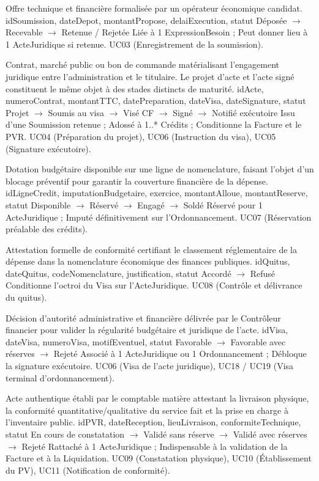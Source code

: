 \documentclass[11pt,a4paper]{article}
\begin{document}
{Offre technique et financière formalisée par un opérateur économique candidat.}
{idSoumission, dateDepot, montantPropose, delaiExecution, statut}
{Déposée $\rightarrow$ Recevable $\rightarrow$ Retenue / Rejetée}
{Liée à 1 ExpressionBesoin ; Peut donner lieu à 1 ActeJuridique si retenue.}
{UC03 (Enregistrement de la soumission).}

{Contrat, marché public ou bon de commande matérialisant l'engagement juridique entre l'administration et le titulaire. Le projet d'acte et l'acte signé constituent le même objet à des stades distincts de maturité.}
{idActe, numeroContrat, montantTTC, datePreparation, dateVisa, dateSignature, statut}
{Projet $\rightarrow$ Soumis au visa $\rightarrow$ Visé CF $\rightarrow$ Signé $\rightarrow$ Notifié exécutoire}
{Issu d'une Soumission retenue ; Adossé à 1..* Crédits ; Conditionne la Facture et le PVR.}
{UC04 (Préparation du projet), UC06 (Instruction du visa), UC05 (Signature exécutoire).}

{Dotation budgétaire disponible sur une ligne de nomenclature, faisant l'objet d'un blocage préventif pour garantir la couverture financière de la dépense.}
{idLigneCredit, imputationBudgetaire, exercice, montantAlloue, montantReserve, statut}
{Disponible $\rightarrow$ Réservé $\rightarrow$ Engagé $\rightarrow$ Soldé}
{Réservé pour 1 ActeJuridique ; Imputé définitivement sur l'Ordonnancement.}
{UC07 (Réservation préalable des crédits).}

{Attestation formelle de conformité certifiant le classement réglementaire de la dépense dans la nomenclature économique des finances publiques.}
{idQuitus, dateQuitus, codeNomenclature, justification, statut}
{Accordé $\rightarrow$ Refusé}
{Conditionne l'octroi du Visa sur l'ActeJuridique.}
{UC08 (Contrôle et délivrance du quitus).}

{Décision d'autorité administrative et financière délivrée par le Contrôleur financier pour valider la régularité budgétaire et juridique de l'acte.}
{idVisa, dateVisa, numeroVisa, motifEventuel, statut}
{Favorable $\rightarrow$ Favorable avec réserves $\rightarrow$ Rejeté}
{Associé à 1 ActeJuridique ou 1 Ordonnancement ; Débloque la signature exécutoire.}
{UC06 (Visa de l'acte juridique), UC18 / UC19 (Visa terminal d'ordonnancement).}

{Acte authentique établi par le comptable matière attestant la livraison physique, la conformité quantitative/qualitative du service fait et la prise en charge à l'inventaire public.}
{idPVR, dateReception, lieuLivraison, conformiteTechnique, statut}
{En cours de constatation $\rightarrow$ Validé sans réserve $\rightarrow$ Validé avec réserves $\rightarrow$ Rejeté}
{Rattaché à 1 ActeJuridique ; Indispensable à la validation de la Facture et à la Liquidation.}
{UC09 (Constatation physique), UC10 (Établissement du PV), UC11 (Notification de conformité).}
\end{document}
